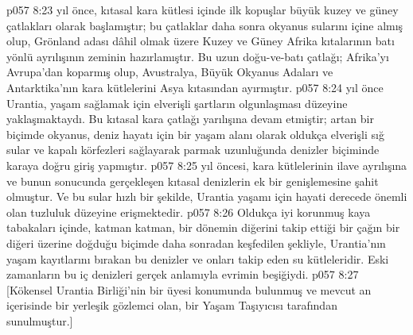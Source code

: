 \vs p057 8:23  yıl önce, kıtasal kara kütlesi içinde ilk kopuşlar büyük kuzey ve güney çatlakları olarak başlamıştır; bu çatlaklar daha sonra okyanus sularını içine almış olup, Grönland adası dâhil olmak üzere Kuzey ve Güney Afrika kıtalarının batı yönlü ayrılışının zeminin hazırlamıştır. Bu uzun doğu\hyp{}ve\hyp{}batı çatlağı; Afrika’yı Avrupa’dan koparmış olup, Avustralya, Büyük Okyanus Adaları ve Antarktika’nın kara kütlelerini Asya kıtasından ayırmıştır.
\vs p057 8:24  yıl önce Urantia, yaşam sağlamak için elverişli şartların olgunlaşması düzeyine yaklaşmaktaydı. Bu kıtasal kara çatlağı yarılışına devam etmiştir; artan bir biçimde okyanus, deniz hayatı için bir yaşam alanı olarak oldukça elverişli sığ sular ve kapalı körfezleri sağlayarak parmak uzunluğunda denizler biçiminde karaya doğru giriş yapmıştır.
\vs p057 8:25  yıl öncesi, kara kütlelerinin ilave ayrılışına ve bunun sonucunda gerçekleşen kıtasal denizlerin ek bir genişlemesine şahit olmuştur. Ve bu sular hızlı bir şekilde, Urantia yaşamı için hayati derecede önemli olan tuzluluk düzeyine erişmektedir.
\vs p057 8:26 Oldukça iyi korunmuş kaya tabakaları içinde, katman katman, bir dönemin diğerini takip ettiği bir çağın bir diğeri üzerine doğduğu biçimde daha sonradan keşfedilen şekliyle, Urantia’nın yaşam kayıtlarını bırakan bu denizler ve onları takip eden su kütleleridir. Eski zamanların bu iç denizleri gerçek anlamıyla evrimin beşiğiydi.
\vs p057 8:27 [Kökensel Urantia Birliği’nin bir üyesi konumunda bulunmuş ve mevcut an içerisinde bir yerleşik gözlemci olan, bir Yaşam Taşıyıcısı tarafından sunulmuştur.]
